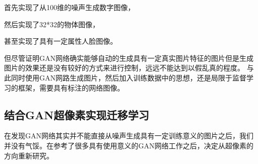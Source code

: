 首先实现了从100维的噪声生成数字图像，

然后实现了32*32的物体图像，

甚至实现了具有一定属性人脸图像。

但尽管证明GAN网络确实能够自动的生成具有一定真实图片特征的图片但是生成图片的效果还是没有较好的方式来进行控制，远远不能达到以假乱真的程度。
与此同时使用GAN网路生成图片，然后加入训练数据中的思想，还是局限于监督学习的框架，需要具有标注的网络图像。

\subsection{结合GAN超像素实现迁移学习}
在发现GAN网络其实并不能直接从噪声生成具有一定训练意义的图片之后，我们并没有气馁。在参考了很多具有使用意义的GAN网络工作之后，决定从超像素的方向重新研究。











